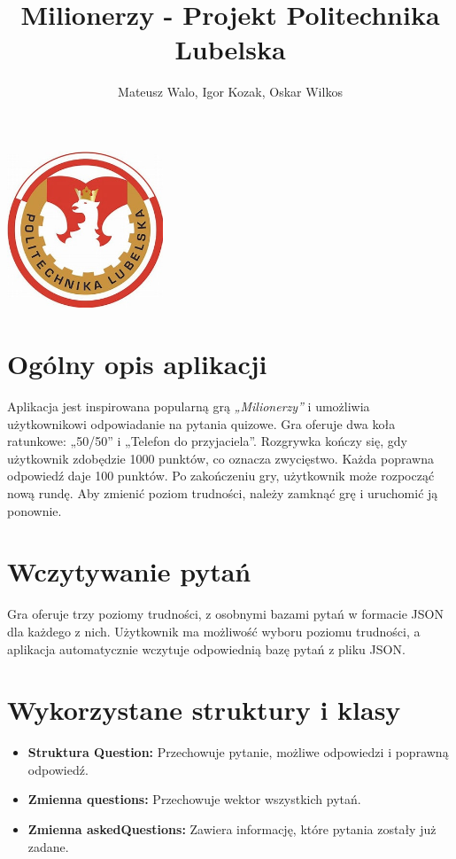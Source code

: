 \documentclass[]{article}
\title{Milionerzy - Projekt Politechnika Lubelska}
\author{Mateusz Walo, Igor Kozak, Oskar Wilkos}
\date{}
\begin{document}
	
	\maketitle
	
	\begin{center}
		\includegraphics[width=0.35\textwidth]{pl.jpg} 
	\end{center}
	
	\tableofcontents
	\newpage
	
	\fancyhf{} %
	\pagestyle{fancy}
	\renewcommand{\cftsecfont}{\bfseries} %
	\setlength{\cftsecnumwidth}{2.5em} %
	
	\section{Ogólny opis aplikacji}
	Aplikacja jest inspirowana popularną grą \emph{„Milionerzy”} i umożliwia użytkownikowi odpowiadanie na pytania quizowe. Gra oferuje dwa koła ratunkowe: „50/50” i „Telefon do przyjaciela”. Rozgrywka kończy się, gdy użytkownik zdobędzie 1000 punktów, co oznacza zwycięstwo. Każda poprawna odpowiedź daje 100 punktów. Po zakończeniu gry, użytkownik może rozpocząć nową rundę. Aby zmienić poziom trudności, należy zamknąć grę i uruchomić ją ponownie.
	
	\section{Wczytywanie pytań}
	Gra oferuje trzy poziomy trudności, z osobnymi bazami pytań w formacie JSON dla każdego z nich. Użytkownik ma możliwość wyboru poziomu trudności, a aplikacja automatycznie wczytuje odpowiednią bazę pytań z pliku JSON.
	
	\section{Wykorzystane struktury i klasy}
	\begin{itemize}
		\item \textbf{Struktura Question:} Przechowuje pytanie, możliwe odpowiedzi i poprawną odpowiedź.
		\item \textbf{Zmienna questions:} Przechowuje wektor wszystkich pytań.
		\item \textbf{Zmienna askedQuestions:} Zawiera informację, które pytania zostały już zadane.
	\end{itemize}
	
\end{document}
